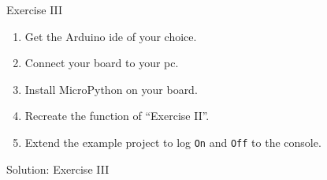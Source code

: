 \begin{frame}
    \begin{exampleblock}{Exercise III}
        \begin{enumerate}
            \item Get the Arduino\textregistered{} \acs{ide} of your choice.
            \item Connect your board to your \acs{pc}.
            \item Install MicroPython on your board.
            \item Recreate the function of ``Exercise II''.
            \item Extend the example project to log \texttt{On} and \texttt{Off} to the console.%
        \end{enumerate}
    \end{exampleblock}
\end{frame}

\begin{frame}{Solution: Exercise III}
    \begin{listing}[H]
        \caption{Solution for Exercise III.}
        \label{lst:arduino:exercise:3:solution}
    \end{listing}
\end{frame}